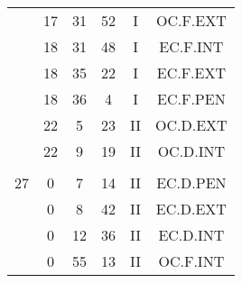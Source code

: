 \documentclass[12pt, a4paper]{article}
\begin{document}
\begin{multicols}{3}
{\begin{tabular}{c c c c c c}
	 	 	 	 & 17 & 31 & 52 & I & OC.F.EXT\\%
	 	 	 	 & 18 & 31 & 48 & I & EC.F.INT\\%
	 	 	 	 & 18 & 35 & 22 & I & EC.F.EXT\\%
	 	 	 	 & 18 & 36 & 4 & I & EC.F.PEN\\%
	 	 	 	 & 22 & 5 & 23 & II & OC.D.EXT\\%
	 	 	 	 & 22 & 9 & 19 & II & OC.D.INT\\%
	 	 	 	 & & & & & \\%
	 	 	 	27 & 0 & 7 & 14 & II & EC.D.PEN\\%
	 	 	 	 & 0 & 8 & 42 & II & EC.D.EXT\\%
	 	 	 	 & 0 & 12 & 36 & II & EC.D.INT\\%
	 	 	 	 & 0 & 55 & 13 & II & OC.F.INT\\%
	 	 \end{tabular}
 	}
\end{multicols}
\end{document}
